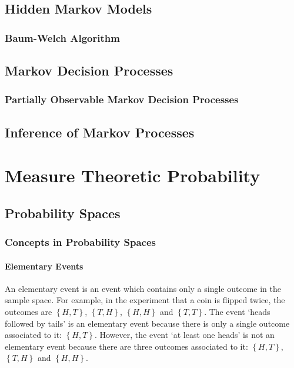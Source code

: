 \documentclass[11pt]{report} %
\begin{document}
\section{Hidden Markov Models}

\subsection{Baum-Welch Algorithm}

\section{Markov Decision Processes}

\subsection{Partially Observable Markov Decision Processes}

\section{Inference of Markov Processes}

\chapter{Measure Theoretic Probability}

\section{Probability Spaces}

\subsection{Concepts in Probability Spaces}

\subsubsection{Elementary Events}
An elementary event is an event which contains only a single outcome in the sample space. For example, in the experiment that a coin is flipped twice, the outcomes are $\left\{H, T\right\}$, $\left\{T, H\right\}$, $\left\{H, H\right\}$ and $\left\{T, T\right\}$. The event `heads followed by tails' is an elementary event because there is only a single outcome associated to it: $\left\{H, T\right\}$. However, the event `at least one heads' is not an elementary event because there are three outcomes associated to it: $\left\{H, T\right\}$, $\left\{T, H\right\}$ and $\left\{H, H\right\}$.
\end{document}
